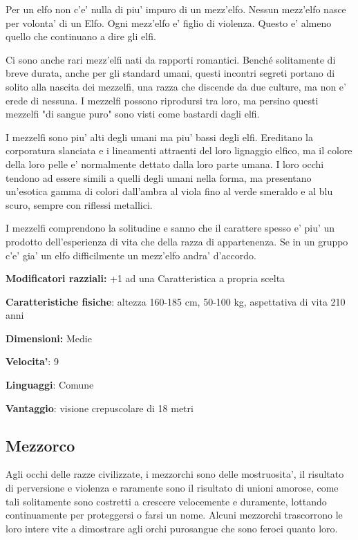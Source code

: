 \documentclass[a4paper,11pt,twoside,openany]{book}
\begin{document}
\label{mezzelfo}

Per un elfo non c'e' nulla di piu' impuro di un mezz'elfo. Nessun mezz'elfo nasce per volonta' di un Elfo. Ogni mezz'elfo e' figlio di violenza. Questo e' almeno quello che continuano a dire gli elfi.

Ci sono anche rari mezz'elfi nati da rapporti romantici. Benché solitamente di breve durata, anche per gli standard umani, questi incontri segreti portano di solito alla nascita dei mezzelfi, una razza che discende da due culture, ma non e' erede di nessuna. I mezzelfi possono riprodursi tra loro, ma persino questi mezzelfi "di sangue puro" sono visti come bastardi dagli elfi.

I mezzelfi sono piu' alti degli umani ma piu' bassi degli elfi. Ereditano la corporatura slanciata e i lineamenti attraenti del loro lignaggio elfico, ma il colore della loro pelle e' normalmente dettato dalla loro parte umana. I loro occhi tendono ad essere simili a quelli degli umani nella forma, ma presentano un'esotica gamma di colori dall'ambra al viola fino al verde smeraldo e al blu scuro, sempre con riflessi metallici.

I mezzelfi comprendono la solitudine e sanno che il carattere spesso e' piu' un prodotto dell'esperienza di vita che della razza di appartenenza. Se in un gruppo c'e' gia' un elfo difficilmente un mezz'elfo andra' d'accordo.

\textbf{Modificatori razziali:} +1 ad una Caratteristica a propria
scelta

\textbf{Caratteristiche fisiche}: altezza 160-185 cm, 50-100 kg, aspettativa di vita 210 anni

\textbf{Dimensioni:} Medie

\textbf{Velocita'}: 9

\textbf{Linguaggi}: Comune

\textbf{Vantaggio}: visione crepuscolare di 18 metri


\subsection{Mezzorco}

\label{mezzorco}

Agli occhi delle razze civilizzate, i mezzorchi sono delle mostruosita', il risultato di perversione e violenza e raramente sono il risultato di unioni amorose, come tali solitamente sono costretti a crescere velocemente e duramente, lottando continuamente per proteggersi o farsi un nome. Alcuni mezzorchi trascorrono le loro intere vite a dimostrare agli orchi purosangue che sono feroci quanto loro.
\end{document}
